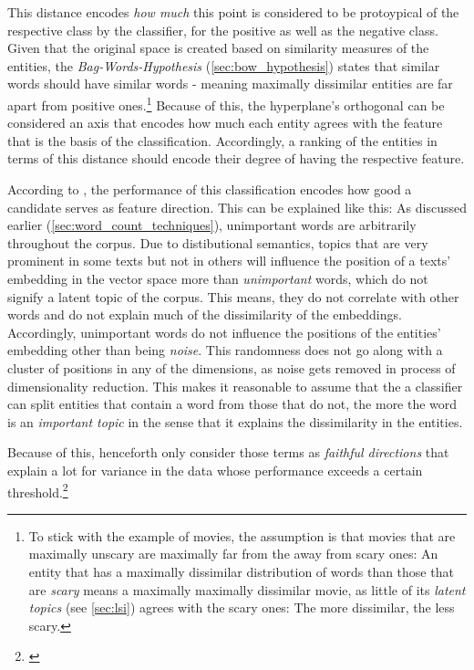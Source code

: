 This distance encodes \textit{how much} this point is considered to be protoypical of the respective class by the classifier, for the positive as well as the negative class. Given that the original space is created based on similarity measures of the entities, the \textit{Bag-Words-Hypothesis} (\autoref{sec:bow_hypothesis}) states that similar words should have similar words - meaning maximally dissimilar entities are far apart from positive ones.\footnote{To stick with the example of movies, the assumption is that movies that are maximally unscary are maximally far from the away from scary ones: An entity that has a maximally dissimilar distribution of words than those that are \textit{scary} means a maximally maximally dissimilar movie, as little of its \textit{latent topics} (see \autoref{sec:lsi}) agrees with the scary ones: The more dissimilar, the less scary.} Because of this, the hyperplane's orthogonal can be considered an axis that encodes how much each entity agrees with the feature that is the basis of the classification. Accordingly, a ranking of the entities in terms of this distance should encode their degree of having the respective feature.

According to \textcite{Derrac2015}, the performance of this classification encodes how good a candidate serves as feature direction. This can be explained like this: As discussed earlier (\autoref{sec:word_count_techniques}), unimportant words are arbitrarily throughout the corpus. Due to distibutional semantics, topics that are very prominent in some texts but not in others will influence the position of a texts' embedding in the vector space more than \textit{unimportant} words, which do not signify a latent topic of the corpus. This means, they do not correlate with other words and do not explain much of the dissimilarity of the embeddings. Accordingly, unimportant words do not influence the positions of the entities' embedding other than being \textit{noise}. This randomness does not go along with a cluster of positions in any of the dimensions, as noise gets removed in process of dimensionality reduction. This makes it reasonable to assume that the a classifier can split entities that contain a word from those that do not, the more the word is an \textit{important topic} in the sense that it explains the dissimilarity in the entities.

Because of this, \cite{Derrac2015} henceforth only consider those terms as \textit{faithful directions} that explain a lot for variance in the data whose performance exceeds a certain threshold.\footnote{ \cite{Ager2018}}

